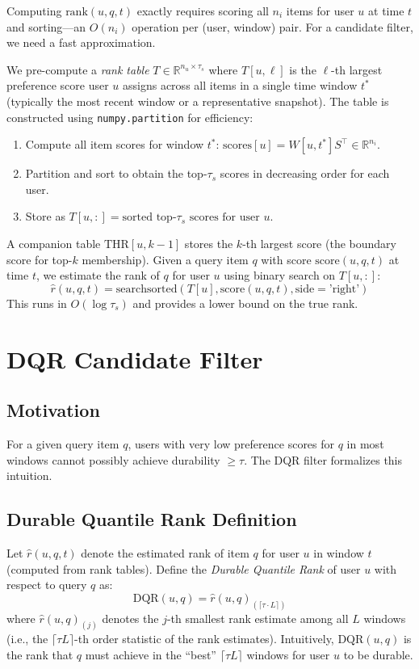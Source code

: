 Computing $\text{rank}(u, q, t)$ exactly requires scoring all $n_i$ items for user $u$ at time $t$ and sorting---an $O(n_i)$ operation per (user, window) pair. For a candidate filter, we need a fast approximation.

We pre-compute a \textit{rank table} $T \in \mathbb{R}^{n_u \times \tau_s}$ where $T[u, \ell]$ is the $\ell$-th largest preference score user $u$ assigns across all items in a single time window $t^*$ (typically the most recent window or a representative snapshot). The table is constructed using \texttt{numpy.partition} for efficiency:
\begin{enumerate}
  \item Compute all item scores for window $t^*$: $\text{scores}[u] = W[u, t^*] S^\top \in \mathbb{R}^{n_i}$.
  \item Partition and sort to obtain the top-$\tau_s$ scores in decreasing order for each user.
  \item Store as $T[u, :] = \text{sorted top-}\tau_s\text{ scores for user }u$.
\end{enumerate}

A companion table $\text{THR}[u, k-1]$ stores the $k$-th largest score (the boundary score for top-$k$ membership). Given a query item $q$ with score $\text{score}(u, q, t)$ at time $t$, we estimate the rank of $q$ for user $u$ using binary search on $T[u, :]$:
\[
  \hat{r}(u, q, t) = \text{searchsorted}(T[u], \text{score}(u, q, t), \text{side}=\text{'right'})
\]
This runs in $O(\log \tau_s)$ and provides a lower bound on the true rank.

\section{DQR Candidate Filter}

\subsection{Motivation}

For a given query item $q$, users with very low preference scores for $q$ in most windows cannot possibly achieve durability $\geq \tau$. The DQR filter formalizes this intuition.

\subsection{Durable Quantile Rank Definition}

Let $\hat{r}(u, q, t)$ denote the estimated rank of item $q$ for user $u$ in window $t$ (computed from rank tables). Define the \textit{Durable Quantile Rank} of user $u$ with respect to query $q$ as:
\[
  \text{DQR}(u, q) = \hat{r}(u, q)_{(\lceil \tau \cdot L \rceil)}
\]
where $\hat{r}(u, q)_{(j)}$ denotes the $j$-th smallest rank estimate among all $L$ windows (i.e., the $\lceil \tau L \rceil$-th order statistic of the rank estimates). Intuitively, $\text{DQR}(u, q)$ is the rank that $q$ must achieve in the ``best'' $\lceil \tau L \rceil$ windows for user $u$ to be durable.

